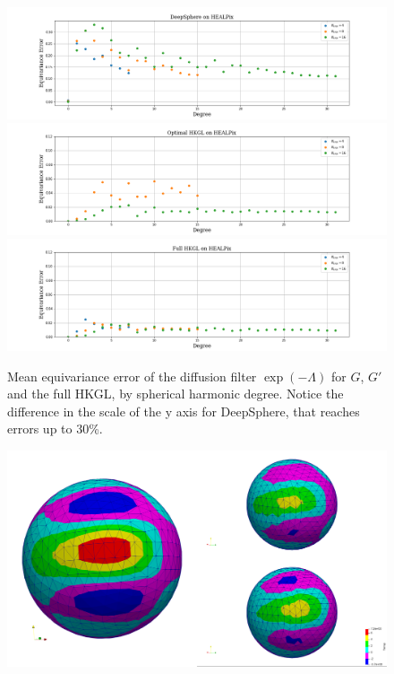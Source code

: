 \begin{figure}[h]
	\centering
	\includegraphics[width=\textwidth]{../codes/06.Equivariance_error/DeepSphereonHEALPix.png}	
	\includegraphics[width=\textwidth]{../codes/06.Equivariance_error/OptimalHKGLonHEALPix.png}	
		\includegraphics[width=\textwidth]{../codes/06.Equivariance_error/FullHKGLonHEALPix.png}	
	\caption{\label{fig:DeepSphere equivariance error}Mean equivariance error of the diffusion filter $\exp(-\Lambda)$ for $G$, $G'$ and the full HKGL, by spherical harmonic degree. Notice the difference in the scale of the y axis for DeepSphere, that reaches errors up to 30\%.}
\end{figure}

\begin{figure}[h!]
	\centering
	\includegraphics[width=\textwidth]{../codes/06.Equivariance_error/img_example_DeepSphere/DS.png}	
	\caption{\label{fig:DeepSphere equivariance error in practice}}
\end{figure}



